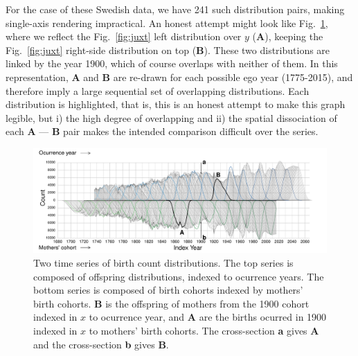 \documentclass{article}
\begin{document}
For the case of these Swedish data, we have 241 such distribution pairs, making single-axis rendering impractical. An honest attempt might look like Fig.~\ref{fig:reflect1}, where we reflect the Fig.~\ref{fig:juxt} left distribution over $y$ (\textbf{A}), keeping the Fig.~\ref{fig:juxt} right-side distribution on top (\textbf{B}). These two distributions are linked by the year 1900, which of course overlaps with neither of them. In this representation, \textbf{A} and \textbf{B} are re-drawn for each possible ego year (1775-2015), and therefore imply a large sequential set of overlapping distributions. Each  distribution is highlighted, that is, this is an honest attempt to make this graph legible, but i) the high degree of overlapping and ii) the spatial dissociation of each \textbf{A} --- \textbf{B} pair makes the intended comparison difficult over the series.

\begin{figure}[ht!]
 \centering
        \includegraphics[width=\textwidth]{Figures/FxFlowReflect.pdf}
        \caption{Two time series of birth count distributions. The top series is composed of offspring distributions, indexed to ocurrence years. The bottom series is composed of birth cohorts indexed by mothers' birth cohorts. \textbf{B} is the offspring of mothers from the 1900 cohort indexed in $x$ to ocurrence year, and \textbf{A} are the births ocurred in 1900 indexed in $x$ to mothers' birth cohorts. The cross-section \textbf{a} gives \textbf{A} and the cross-section \textbf{b} gives \textbf{B}.}
          \label{fig:reflect1}
\end{figure}
\end{document}
